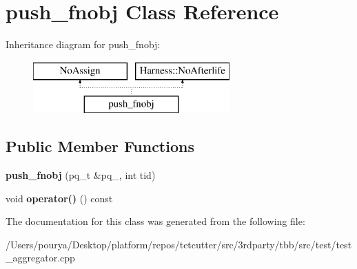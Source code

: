 \hypertarget{classpush__fnobj}{}\section{push\+\_\+fnobj Class Reference}
\label{classpush__fnobj}
Inheritance diagram for push\+\_\+fnobj\+:\begin{figure}[H]
\begin{center}
\leavevmode
\includegraphics[height=2.000000cm]{classpush__fnobj}
\end{center}
\end{figure}
\subsection*{Public Member Functions}
\begin{DoxyCompactItemize}
\item 
\hypertarget{classpush__fnobj_a0ffa5bc638b2a8e33facdea3a4c805be}{}{\bfseries push\+\_\+fnobj} (pq\+\_\+t \&pq\+\_\+, int tid)\label{classpush__fnobj_a0ffa5bc638b2a8e33facdea3a4c805be}

\item 
\hypertarget{classpush__fnobj_a7cd1bd11bf02099414197e33dce37127}{}void {\bfseries operator()} () const \label{classpush__fnobj_a7cd1bd11bf02099414197e33dce37127}

\end{DoxyCompactItemize}


The documentation for this class was generated from the following file\+:\begin{DoxyCompactItemize}
\item 
/\+Users/pourya/\+Desktop/platform/repos/tetcutter/src/3rdparty/tbb/src/test/test\+\_\+aggregator.\+cpp\end{DoxyCompactItemize}
